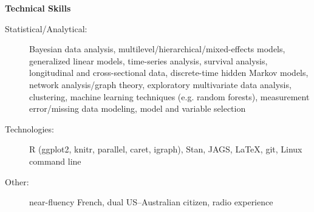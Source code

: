 \documentclass[letterpaper,11pt]{article}
\newcommand{\resheading}[1]{{\large \colorbox{mygrey}{\begin{minipage}{\textwidth}{\textbf{#1 \vphantom{p\^{E}}}}\end{minipage}}}}
\begin{document}

%

\vspace{0.22in}
\resheading{Technical Skills}
	\begin{description}
    \item[Statistical/Analytical:] { \footnotesize Bayesian data analysis, multilevel/hierarchical/mixed-effects models, generalized linear models, time-series analysis, survival analysis, longitudinal and cross-sectional data, discrete-time hidden Markov models, network analysis/graph theory, exploratory multivariate data analysis, clustering, machine learning techniques (e.g. random forests), measurement error/missing data modeling, model and variable selection }
    \item[Technologies:] { \footnotesize R (ggplot2, knitr, parallel, caret, igraph), Stan, JAGS, \LaTeX, git, Linux command line }
    \item[Other:] { \footnotesize near-fluency French, dual US--Australian citizen, radio experience }
	\end{description} %

\end{document}
